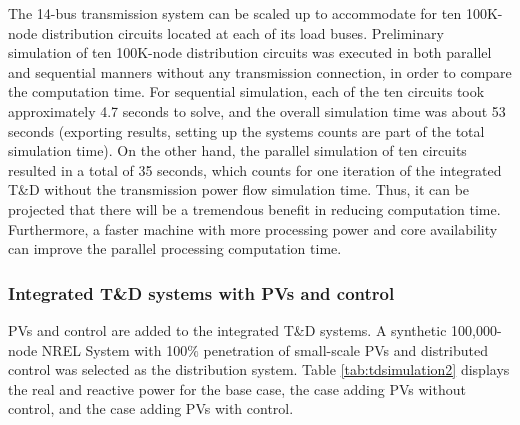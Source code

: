 \documentclass{article}
\begin{document}
\begin{table}[h]
\centering
\caption{Simulation results of integrated T\&D study}
\label{tab:tdsimulation1}
\end{table}

The 14-bus transmission system can be scaled up to accommodate for ten 100K-node distribution circuits located at each of its load buses. Preliminary simulation of ten 100K-node distribution circuits was executed in both parallel and sequential manners without any transmission connection, in order to compare the computation time. For sequential simulation, each of the ten circuits took approximately 4.7 seconds to solve, and the overall simulation time was about 53 seconds (exporting results, setting up the systems counts are part of the total simulation time). On the other hand, the parallel simulation of ten circuits resulted in a total of 35 seconds, which counts for one iteration of the integrated T\&D without the transmission power flow simulation time. Thus, it can be projected that there will be a tremendous benefit in reducing computation time. Furthermore, a faster machine with more processing power and core availability can improve the parallel processing computation time.\par

\subsubsection{Integrated T\&D systems with PVs and control}
PVs and control are added to the integrated T\&D systems. A synthetic 100,000-node NREL System with 100$\%$ penetration of small-scale PVs and distributed control was selected as the distribution system. Table \ref{tab:tdsimulation2} displays the real and reactive power for the base case, the case adding PVs without control, and the case adding PVs with control.\par
\end{document}
